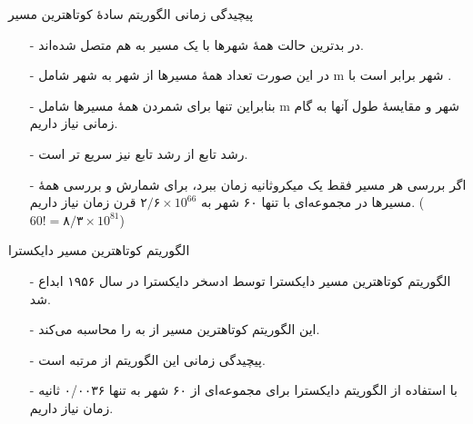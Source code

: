 \begin{frame}{پیچیدگی زمانی الگوریتم سادهٔ کوتاهترین مسیر}
\begin{itemize}\itmsep{5mm}
\item[-]
در بدترین حالت همهٔ شهرها با یک مسیر به هم متصل شده‌اند.
\item[-]
در این صورت تعداد همهٔ مسیرها از شهر
به شهر
شامل
m
شهر
برابر است با
.
\item[-]
بنابراین تنها برای شمردن همهٔ مسیرها شامل m شهر و مقایسهٔ طول آنها به
گام زمانی نیاز داریم.
\item[-]
رشد تابع
از رشد تابع
نیز سریع تر است.
\item[-]
اگر بررسی هر مسیر فقط یک میکروثانیه زمان ببرد، برای شمارش و بررسی همهٔ مسیرها در مجموعه‌ای با تنها ۶۰ شهر به 
$\text{۲/۶} \times \text{10}^\text{66}$
قرن زمان نیاز داریم.
($\text{60} ! = \text{۸/۳} \times \text{10}^\text{81}$)
\end{itemize}
\end{frame}

\begin{frame}{الگوریتم کوتاهترین مسیر دایکسترا}
\begin{itemize}\itmsep{5mm}
\item[-] 
الگوریتم کوتاهترین مسیر دایکسترا توسط ادسخر دایکسترا
 در سال ۱۹۵۶ ابداع شد.
\item[-]
این الگوریتم
کوتاهترین مسیر از
به
را محاسبه می‌کند.
\item[-]
 پیچیدگی زمانی این الگوریتم از مرتبه
است.
\item[-]
با استفاده از الگوریتم دایکسترا برای مجموعه‌ای از ۶۰ شهر به تنها ۰/‌۰۰۳۶ ثانیه زمان نیاز داریم.
\end{itemize}
\end{frame}
